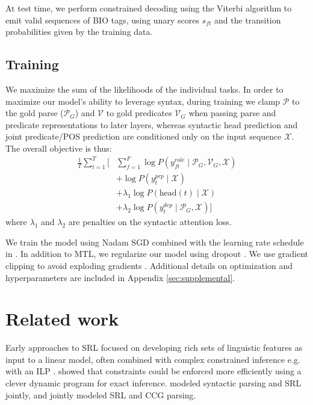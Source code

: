 \documentclass[11pt,a4paper]{article}
\begin{document}
At test time, we perform constrained decoding using the Viterbi algorithm to emit valid sequences of BIO tags, using unary scores $s_{ft}$ and the transition probabilities given by the training data.

\subsection{Training \label{sec:train-opt}}
We maximize the sum of the likelihoods of the individual tasks.
In order to maximize our model's ability to leverage syntax, during training we clamp $\mathcal{P}$ to the gold parse ($\mathcal{P}_G$) and $\mathcal{V}$ to gold predicates $\mathcal{V}_G$ when passing parse and predicate representations to later layers, whereas syntactic head prediction and joint predicate/POS prediction are conditioned only on the input sequence $\mathcal{X}$. The overall objective is thus:
\begin{align}
\frac{1}{T}\sum_{t=1}^T\Big[&\sum_{f=1}^F \log P(y_{ft}^{role}\mid \mathcal{P}_G, \mathcal{V}_G, \mathcal{X}) \nonumber \\ &+ \log P(y_t^{prp}\mid \mathcal{X}) \nonumber \\ &+ \lambda_1 \log P(\mathrm{head}(t)\mid \mathcal{X}) \nonumber \\ &+ \lambda_2 \log P(y_t^{dep} \mid \mathcal{P}_G, \mathcal{X}) \label{eqn:rel-term} \Big]
\end{align}
where $\lambda_1$ and $\lambda_2$ are penalties on the syntactic attention loss. 


We train the model using Nadam \citep{dozat2016incorporating} SGD combined with the learning rate schedule in \citet{vaswani2017attention}. In addition to MTL, we regularize our model using dropout \citep{srivastava2014dropout}. We use gradient clipping to avoid exploding gradients \citep{bengio1994learning, pascanu2013on}. Additional details on optimization and hyperparameters are included in Appendix \ref{sec:supplemental}.









\section{Related work}

Early approaches to SRL \citep{pradhan2005semantic,surdeanu2007combination,johansson2008dependency,toutanova2008global} focused on developing rich sets of linguistic features as input to a linear model, often combined with complex constrained inference e.g. with an ILP \citep{punyakanok2008importance}. \citet{tackstrom2015efficient} showed that constraints could be enforced more efficiently using a clever dynamic program for exact inference. 
\citet{sutton2005joint} modeled syntactic parsing and SRL jointly, and \citet{lewis2015joint} jointly modeled SRL and CCG parsing. 
\end{document}
